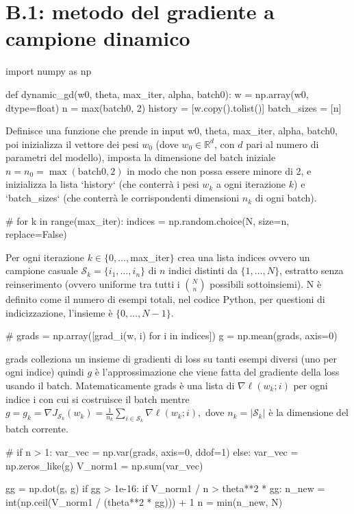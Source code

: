 \documentclass[italian, a4paper, twoside, binding=6mm]{sapthesis}
\begin{document}
\section{B.1: metodo del gradiente a campione dinamico}
\begin{pythoncode}[title= Dynamic GD]

import numpy as np

def dynamic_gd(w0, theta, max_iter, alpha, batch0):
    w = np.array(w0, dtype=float)
    n = max(batch0, 2)
    history     = [w.copy().tolist()]
    batch_sizes = [n]
\end{pythoncode}
Definisce una funzione che prende in input w0, theta, max\_iter, alpha, batch0, poi inizializza il vettore dei pesi $w_0$ (dove $w_0 \in \mathbb{R}^d$, con $d$ pari al numero di parametri del modello), imposta la dimensione del batch iniziale $n=n_0 = \max(\text{batch0}, 2)$ in modo che non possa essere minore di 2, e inizializza la lista `history` (che conterrà i pesi $w_k$ a ogni iterazione $k$) e `batch\_sizes` (che conterrà le corrispondenti dimensioni $n_k$ di ogni batch).
\begin{pythoncode}[title= Dynamic GD]

#
    for k in range(max_iter):
        indices = np.random.choice(N, size=n, replace=False)
\end{pythoncode}
Per ogni iterazione $k \in \{0,\dots,$max\_iter$\}$ crea una lista indices ovvero un campione casuale \(\mathcal{S}_k = \{i_1, \dots, i_n\}\) di \(n\) indici distinti da \(\{1,\dots,N\}\), estratto senza reinserimento (ovvero uniforme tra tutti i \(\binom{N}{n}\) possibili sottoinsiemi). N è definito come il numero di esempi totali, nel codice Python, per questioni di indicizzazione, l'insieme è \(\{0,\dots,N-1\}\).
\begin{pythoncode}[title= Dynamic GD]

#
        grads = np.array([grad_i(w, i) for i in indices])
        g = np.mean(grads, axis=0)
\end{pythoncode}
grads colleziona un insieme di gradienti di loss su tanti esempi diversi (uno per ogni indice) quindi $g$ è l'approssimazione che viene fatta del gradiente della loss usando il batch. Matematicamente grads è una lista di $\nabla \ell(w_k; i)$ per ogni indice i con cui si costruisce il batch mentre $g=g_k = \nabla J_{\mathcal{S}_k}(w_k) = \frac{1}{n_k} \sum_{i \in \mathcal{S}_k} \nabla \ell(w_k; i),$ dove \(n_k = |\mathcal{S}_k|\) è la dimensione del batch corrente.


\begin{pythoncode}[title= Dynamic GD]

#    
        if n > 1:
            var_vec = np.var(grads, axis=0, ddof=1)
        else:
            var_vec = np.zeros_like(g)
        V_norm1 = np.sum(var_vec)

        gg = np.dot(g, g)
        if gg > 1e-16:
            if V_norm1 / n > theta**2 * gg:
                n_new = int(np.ceil(V_norm1 / (theta**2 * gg))) + 1
                n = min(n_new, N)
\end{pythoncode}
\end{document}
